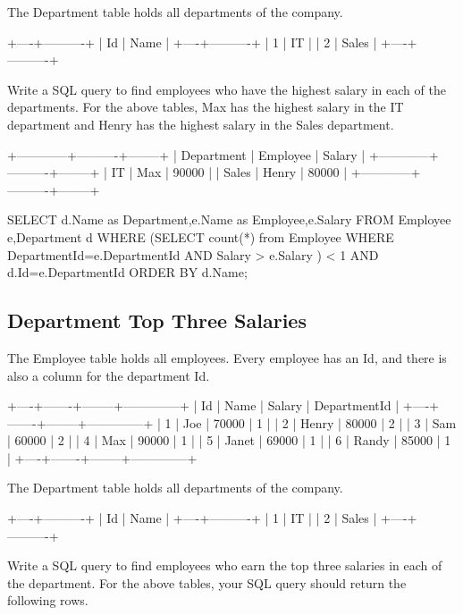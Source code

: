 The Department table holds all departments of the company.
\begin{Code}
	+----+----------+
	| Id | Name     |
	+----+----------+
	| 1  | IT       |
	| 2  | Sales    |
	+----+----------+
\end{Code}

Write a SQL query to find employees who have the highest salary in each of the departments. For the above tables, Max has the highest salary in the IT department and Henry has the 
highest salary in the Sales department.
\begin{Code}
	+------------+----------+--------+
	| Department | Employee | Salary |
	+------------+----------+--------+
	| IT         | Max      | 90000  |
	| Sales      | Henry    | 80000  |
	+------------+----------+--------+
\end{Code}

\begin{Code}
	SELECT d.Name as Department,e.Name as Employee,e.Salary 
	FROM Employee e,Department d 
	WHERE (SELECT count(*) from Employee 
		   WHERE DepartmentId=e.DepartmentId AND Salary > e.Salary
		  ) < 1 
	AND d.Id=e.DepartmentId 
	ORDER BY d.Name;
\end{Code}

\subsection{Department Top Three Salaries}
The Employee table holds all employees. Every employee has an Id, and there is also a column for the department Id.
\begin{Code}
	+----+-------+--------+--------------+
	| Id | Name  | Salary | DepartmentId |
	+----+-------+--------+--------------+
	| 1  | Joe   | 70000  | 1            |
	| 2  | Henry | 80000  | 2            |
	| 3  | Sam   | 60000  | 2            |
	| 4  | Max   | 90000  | 1            |
	| 5  | Janet | 69000  | 1            |
	| 6  | Randy | 85000  | 1            |
	+----+-------+--------+--------------+
\end{Code}

The Department table holds all departments of the company.
\begin{Code}
	+----+----------+
	| Id | Name     |
	+----+----------+
	| 1  | IT       |
	| 2  | Sales    |
	+----+----------+
\end{Code}

Write a SQL query to find employees who earn the top three salaries in each of the department. For the above tables, your SQL query should return the following rows.

